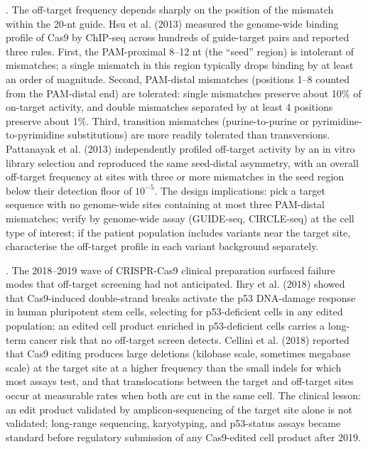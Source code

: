 . The off-target frequency
depends sharply on the position of the mismatch within the 20-nt
guide. Hsu et al. (2013)\cite[pp.~828--829]{paper:v6c09-hsu-offtarget-2013}
measured the genome-wide binding profile of Cas9 by ChIP-seq across
hundreds of guide-target pairs and reported three rules. First, the
PAM-proximal 8--12 nt (the ``seed'' region) is intolerant of
mismatches; a single mismatch in this region typically drops binding
by at least an order of magnitude. Second, PAM-distal mismatches
(positions 1--8 counted from the PAM-distal end) are tolerated:
single mismatches preserve about 10\% of on-target activity, and
double mismatches separated by at least 4 positions preserve about
1\%. Third, transition mismatches (purine-to-purine or
pyrimidine-to-pyrimidine substitutions) are more readily tolerated
than transversions. Pattanayak et al. (2013)
\cite[pp.~840--843]{paper:v6c09-pattanayak-offtarget-2013}
independently profiled off-target activity by an in vitro library
selection and reproduced the same seed-distal asymmetry, with an
overall off-target frequency at sites with three or more mismatches
in the seed region below their detection floor of $10^{-5}$. The
design implications: pick a target sequence with no genome-wide
sites containing at most three PAM-distal mismatches; verify by
genome-wide assay (GUIDE-seq, CIRCLE-seq) at the cell type of
interest; if the patient population includes variants near the
target site, characterise the off-target profile in each variant
background separately.

.
The 2018--2019 wave of CRISPR-Cas9 clinical preparation surfaced
failure modes that off-target screening had not anticipated. Ihry
et al. (2018)\cite[pp.~939--942]{paper:v6c09-ihry-p53-2018} showed
that Cas9-induced double-strand breaks activate the p53 DNA-damage
response in human pluripotent stem cells, selecting for p53-deficient
cells in any edited population; an edited cell product enriched in
p53-deficient cells carries a long-term cancer risk that no
off-target screen detects. Cellini et al. (2018)
\cite[pp.~767--770]{paper:v6c09-kosicki-deletions-2018} reported
that Cas9 editing produces large deletions (kilobase scale, sometimes
megabase scale) at the target site at a higher frequency than the
small indels for which most assays test, and that translocations
between the target and off-target sites occur at measurable rates
when both are cut in the same cell. The clinical lesson: an edit
product validated by amplicon-sequencing of the target site alone
is not validated; long-range sequencing, karyotyping, and p53-status
assays became standard before regulatory submission of any
Cas9-edited cell product after 2019.

